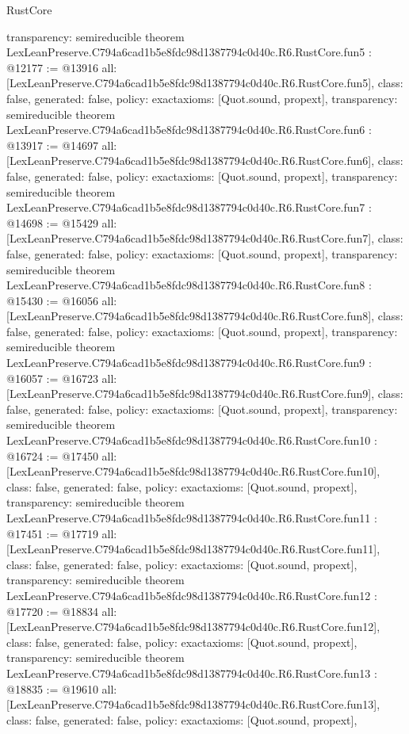 \begin{lexlean}{RustCore}
\begin{coremodule}
{  transparency: semireducible
}
theorem LexLeanPreserve.C794a6cad1b5e8fdc98d1387794c0d40c.R6.RustCore.fun5 : @12177 := @13916 {
  all: [LexLeanPreserve.C794a6cad1b5e8fdc98d1387794c0d40c.R6.RustCore.fun5],
  class: false,
  generated: false,
  policy: exact{axioms: [Quot.sound, propext]},
  transparency: semireducible
}
theorem LexLeanPreserve.C794a6cad1b5e8fdc98d1387794c0d40c.R6.RustCore.fun6 : @13917 := @14697 {
  all: [LexLeanPreserve.C794a6cad1b5e8fdc98d1387794c0d40c.R6.RustCore.fun6],
  class: false,
  generated: false,
  policy: exact{axioms: [Quot.sound, propext]},
  transparency: semireducible
}
theorem LexLeanPreserve.C794a6cad1b5e8fdc98d1387794c0d40c.R6.RustCore.fun7 : @14698 := @15429 {
  all: [LexLeanPreserve.C794a6cad1b5e8fdc98d1387794c0d40c.R6.RustCore.fun7],
  class: false,
  generated: false,
  policy: exact{axioms: [Quot.sound, propext]},
  transparency: semireducible
}
theorem LexLeanPreserve.C794a6cad1b5e8fdc98d1387794c0d40c.R6.RustCore.fun8 : @15430 := @16056 {
  all: [LexLeanPreserve.C794a6cad1b5e8fdc98d1387794c0d40c.R6.RustCore.fun8],
  class: false,
  generated: false,
  policy: exact{axioms: [Quot.sound, propext]},
  transparency: semireducible
}
theorem LexLeanPreserve.C794a6cad1b5e8fdc98d1387794c0d40c.R6.RustCore.fun9 : @16057 := @16723 {
  all: [LexLeanPreserve.C794a6cad1b5e8fdc98d1387794c0d40c.R6.RustCore.fun9],
  class: false,
  generated: false,
  policy: exact{axioms: [Quot.sound, propext]},
  transparency: semireducible
}
theorem LexLeanPreserve.C794a6cad1b5e8fdc98d1387794c0d40c.R6.RustCore.fun10 : @16724 := @17450 {
  all: [LexLeanPreserve.C794a6cad1b5e8fdc98d1387794c0d40c.R6.RustCore.fun10],
  class: false,
  generated: false,
  policy: exact{axioms: [Quot.sound, propext]},
  transparency: semireducible
}
theorem LexLeanPreserve.C794a6cad1b5e8fdc98d1387794c0d40c.R6.RustCore.fun11 : @17451 := @17719 {
  all: [LexLeanPreserve.C794a6cad1b5e8fdc98d1387794c0d40c.R6.RustCore.fun11],
  class: false,
  generated: false,
  policy: exact{axioms: [Quot.sound, propext]},
  transparency: semireducible
}
theorem LexLeanPreserve.C794a6cad1b5e8fdc98d1387794c0d40c.R6.RustCore.fun12 : @17720 := @18834 {
  all: [LexLeanPreserve.C794a6cad1b5e8fdc98d1387794c0d40c.R6.RustCore.fun12],
  class: false,
  generated: false,
  policy: exact{axioms: [Quot.sound, propext]},
  transparency: semireducible
}
theorem LexLeanPreserve.C794a6cad1b5e8fdc98d1387794c0d40c.R6.RustCore.fun13 : @18835 := @19610 {
  all: [LexLeanPreserve.C794a6cad1b5e8fdc98d1387794c0d40c.R6.RustCore.fun13],
  class: false,
  generated: false,
  policy: exact{axioms: [Quot.sound, propext]},
}
\end{coremodule}
\end{lexlean}
